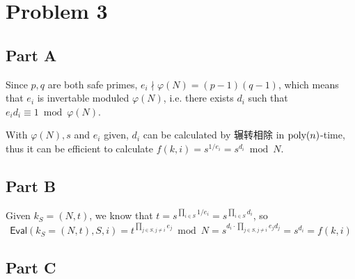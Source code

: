 \documentclass[8pt]{article}
\theoremstyle{compact}
\begin{document}
\section*{Problem 3}
\subsection*{Part A}
Since $p, q$ are both safe primes, $e_i \nmid \varphi(N) = (p-1)(q-1)$, which means that $e_i$ is invertable moduled $\varphi(N)$, i.e. there exists $d_i$ such that $e_id_i \equiv 1 \bmod \varphi(N)$.

With $\varphi(N), s$ and $e_i$ given, $d_i$ can be calculated by 辗转相除 in $\text{poly}(n)$-time, thus it can be efficient to calculate $f(k, i) = s^{1/e_i} = s^{d_i} \bmod N$.

\subsection*{Part B}
Given $k_S = (N, t)$, we know that $t = s^{\prod_{i \in S} 1 / e_i} = s^{\prod_{i \in S}d_i}$, so
$$\textsf{Eval}(k_S = (N, t), S, i) = t^{\prod_{j \in S, j \neq i}e_j} \bmod N = s^{d_i \cdot \prod_{j \in S, j \neq i}e_jd_j} = s^{d_i} = f(k, i)$$

\subsection*{Part C}
\end{document}
